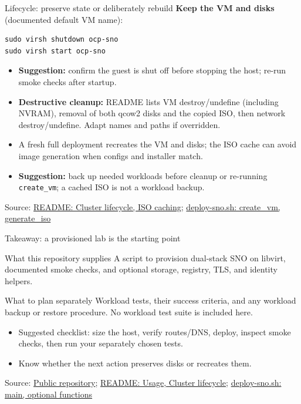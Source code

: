 \documentclass[aspectratio=169,11pt]{beamer}
\newcommand{\reposource}[1]{\par\vfill{\tiny Source: #1\par}}
\newcommand{\readmeref}[1]{\href{https://github.com/matejvasek/mycluster/blob/master/README.md}{README: #1}}
\newcommand{\scriptref}[1]{\href{https://github.com/matejvasek/mycluster/blob/master/deploy-sno.sh}{deploy-sno.sh: #1}}
\begin{document}
\begin{frame}[fragile]{Lifecycle: preserve state or deliberately rebuild}
  \textbf{Keep the VM and disks} (documented default VM name):
\begin{verbatim}
sudo virsh shutdown ocp-sno
sudo virsh start ocp-sno
\end{verbatim}
  \begin{itemize}
    \item \textbf{Suggestion:} confirm the guest is shut off before stopping
      the host; re-run smoke checks after startup.
    \item \textbf{Destructive cleanup:} README lists VM destroy/undefine
      (including NVRAM), removal of both qcow2 disks and the copied ISO,
      then network destroy/undefine. Adapt names and paths if overridden.
    \item A fresh full deployment recreates the VM and disks; the ISO cache
      can avoid image generation when configs and installer match.
    \item \textbf{Suggestion:} back up needed workloads before cleanup or
      re-running \texttt{create\_vm}; a cached ISO is not a workload backup.
  \end{itemize}
  \reposource{\readmeref{Cluster lifecycle, ISO caching}; \scriptref{create\_vm, generate\_iso}}
\end{frame}

\begin{frame}{Takeaway: a provisioned lab is the starting point}
  \begin{block}{What this repository supplies}
    A script to provision dual-stack SNO on libvirt, documented smoke
    checks, and optional storage, registry, TLS, and identity helpers.
  \end{block}
  \begin{block}{What to plan separately}
    Workload tests, their success criteria, and any workload backup or
    restore procedure. No workload test suite is included here.
  \end{block}
  \begin{itemize}
    \item Suggested checklist: size the host, verify routes/DNS, deploy,
      inspect smoke checks, then run your separately chosen tests.
    \item Know whether the next action preserves disks or recreates them.
  \end{itemize}
  \reposource{\href{https://github.com/matejvasek/mycluster}{Public repository};
    \readmeref{Usage, Cluster lifecycle}; \scriptref{main, optional functions}}
\end{frame}
\end{document}
